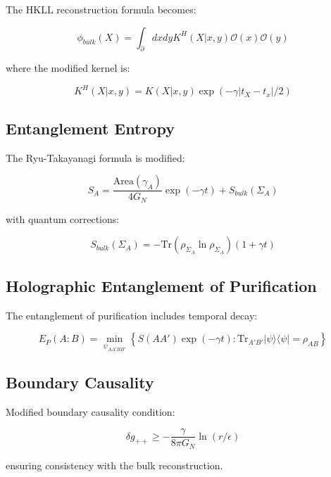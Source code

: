 \documentclass[12pt]{article}
\theoremstyle{plain}
\theoremstyle{definition}
\theoremstyle{remark}
\begin{document}
The HKLL reconstruction formula becomes:

\begin{equation}
\phi_{bulk}(X) = \int_{\partial} dx dy K^H(X|x,y)\mathcal{O}(x)\mathcal{O}(y)
\end{equation}

where the modified kernel is:

\begin{equation}
K^H(X|x,y) = K(X|x,y)\exp(-\gamma|t_X-t_x|/2)
\end{equation}

\subsection{Entanglement Entropy}

The Ryu-Takayanagi formula is modified:

\begin{equation}
S_A = \frac{\text{Area}(\gamma_A)}{4G_N}\exp(-\gamma t) + S_{bulk}(\Sigma_A)
\end{equation}

with quantum corrections:

\begin{equation}
S_{bulk}(\Sigma_A) = -\text{Tr}(\rho_{\Sigma_A}\ln\rho_{\Sigma_A})(1 + \gamma t)
\end{equation}

\subsection{Holographic Entanglement of Purification}

The entanglement of purification includes temporal decay:

\begin{equation}
E_P(A:B) = \min_{\psi_{AA'BB'}} \left\{S(AA')\exp(-\gamma t) : \text{Tr}_{A'B'}|\psi\rangle\langle\psi| = \rho_{AB}\right\}
\end{equation}

\subsection{Boundary Causality}

Modified boundary causality condition:

\begin{equation}
\delta g_{++} \geq -\frac{\gamma}{8\pi G_N}\ln(r/\epsilon)
\end{equation}

ensuring consistency with the bulk reconstruction.
\end{document}
